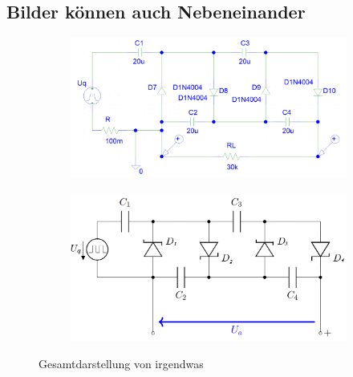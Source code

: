 \documentclass[
12pt,
a4paper,
headings=small,                    %
bibliography=totoc,                %
listof=totoc,                      %
parskip=half*,                     %
]{scrartcl}                        %
\newcommand{\laborsubsection}[2] {
	\renewcommand{\thesubsection}{#1 \thesection.\arabic{subsection}}
	\subsection{{\boldmath #2}}
	\renewcommand{\thesubsection}{\thesection.\arabic{subsection}}
}
\begin{document}
\laborsubsection{D}{Bilder können auch Nebeneinander}
\begin{figure}[H]
	\centering
	\begin{subfigure}[b]{0.45\textwidth} %
		\includegraphics[width=\textwidth]{psch_kaskade}
		\label{psch_kaskade}
	\end{subfigure}
	\hfill %
	\begin{subfigure}[b]{0.45\textwidth}
		\includegraphics[width=\textwidth]{schaltung}
		\label{kaskadenschaltung_2}
	\end{subfigure}
	\caption{Gesamtdarstellung von irgendwas}
\end{figure}
\end{document}
